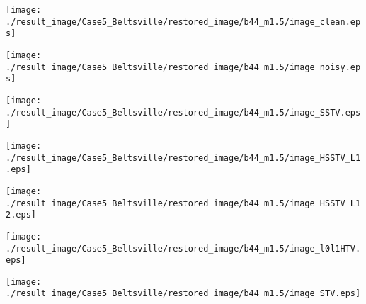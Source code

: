 \begin{figure*}[t]
	\begin{center}
		\begin{minipage}{0.125\hsize}
			\centerline{\texttt{[image: ./result\_image/Case5\_Beltsville/restored\_image/b44\_m1.5/image\_clean.eps]}} %
		\end{minipage}
		\begin{minipage}{0.125\hsize}
			\centerline{\texttt{[image: ./result\_image/Case5\_Beltsville/restored\_image/b44\_m1.5/image\_noisy.eps]}} %
		\end{minipage}
		\begin{minipage}{0.125\hsize}
			\centerline{\texttt{[image: ./result\_image/Case5\_Beltsville/restored\_image/b44\_m1.5/image\_SSTV.eps]}} %
		\end{minipage}
		\begin{minipage}{0.125\hsize}
			\centerline{\texttt{[image: ./result\_image/Case5\_Beltsville/restored\_image/b44\_m1.5/image\_HSSTV\_L1.eps]}} %
		\end{minipage}
		\begin{minipage}{0.125\hsize}
			\centerline{\texttt{[image: ./result\_image/Case5\_Beltsville/restored\_image/b44\_m1.5/image\_HSSTV\_L12.eps]}} %
		\end{minipage}
		\begin{minipage}{0.125\hsize}
			\centerline{\texttt{[image: ./result\_image/Case5\_Beltsville/restored\_image/b44\_m1.5/image\_l0l1HTV.eps]}} %
		\end{minipage}
		\begin{minipage}{0.125\hsize}
			\centerline{\texttt{[image: ./result\_image/Case5\_Beltsville/restored\_image/b44\_m1.5/image\_STV.eps]}} %
		\end{minipage}
		\begin{minipage}{0.050\hsize}
			\centerline{\hspace{\hsize}} %
		\end{minipage}
		
		\vspace{1mm}
		

\end{center}
\end{figure*}
